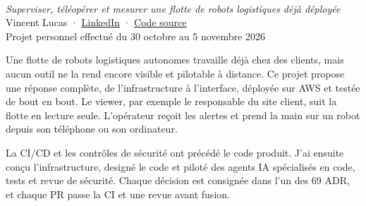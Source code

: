 \documentclass[9pt,a4paper]{extarticle}
\begin{document}
\sloppy

\\[1mm]
{\fontsize{10}{12}\selectfont\itshape Superviser, téléopérer et mesurer une flotte de robots logistiques déjà déployée}\\[1.6mm]
{\fontsize{7.5}{9}\selectfont Vincent Lucas ·
\href{https://www.linkedin.com/in/vincent-lucas-483b29295/}{\underline{LinkedIn}} ·
\href{https://github.com/vinsl/robot-fleet-console}{\underline{Code source}}\\
\color{secondary}Projet personnel effectué du 30 octobre au 5 novembre 2026}

\noindent\begin{minipage}[t]{0.50\linewidth}\vspace{0pt}
  \fontsize{8.7}{10.3}\selectfont
  Une flotte de robots logistiques autonomes travaille déjà chez des clients, mais aucun outil ne la rend encore visible et pilotable à distance. Ce projet propose une réponse complète, de l'infrastructure à l'interface, déployée sur AWS et testée de bout en bout. Le viewer, par exemple le responsable du site client, suit la flotte en lecture seule. L'opérateur reçoit les alertes et prend la main sur un robot depuis son téléphone ou son ordinateur.\par\vspace{1mm}
  La CI/CD et les contrôles de sécurité ont précédé le code produit. J'ai ensuite conçu l'infrastructure, designé le code et piloté des agents IA spécialisés en code, tests et revue de sécurité. Chaque décision est consignée dans l'un des 69 ADR, et chaque PR passe la CI et une revue avant fusion.
\end{minipage}\hfill
\begin{minipage}[t]{0.47\linewidth}\vspace{0pt}
  \renewcommand{\shotzoom}{1}\renewcommand{\shotratio}{0.464}
\end{minipage}
\end{document}
